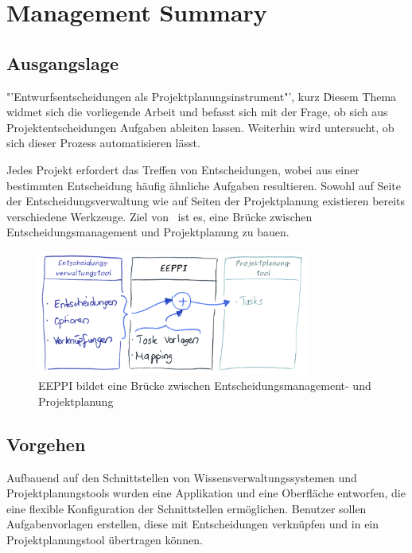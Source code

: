 \chapter{Management Summary}
	\captionsetup[figure]{labelformat=empty} %

	
	\section{Ausgangslage}
	
	"'Entwurfsentscheidungen als Projektplanungsinstrument"', kurz \eeppi\. 
	Diesem Thema widmet sich die vorliegende Arbeit und befasst sich mit der Frage, 
	ob sich aus Projektentscheidungen Aufgaben ableiten lassen. 
	Weiterhin wird untersucht, ob sich dieser Prozess automatisieren lässt. 

	Jedes Projekt erfordert das Treffen von Entscheidungen, 
	wobei aus einer bestimmten Entscheidung häufig ähnliche Aufgaben resultieren. 
	Sowohl auf Seite der Entscheidungsverwaltung wie auf Seiten der Projektplanung existieren bereits verschiedene Werkzeuge. 
	Ziel von \eeppi\ ist es, eine Brücke zwischen Entscheidungsmanagement und Projektplanung zu bauen.
	
	\begin{figure}[H]
		\includegraphics[width=0.8\textwidth]{introduction/img/eeppiVision.png}
		\centering
		\caption{EEPPI bildet eine Brücke zwischen Entscheidungsmanagement- und Projektplanung}
		\label{fig:eeppiBridgeBetweenDecisionsAndTasks}
	\end{figure}
	
	
	\section{Vorgehen}
	
	Aufbauend auf den Schnittstellen von Wissensverwaltungssystemen und Projektplanungstools wurden eine Applikation und eine Oberfläche entworfen, 
	die eine flexible Konfiguration der Schnittstellen ermöglichen. 
	Benutzer sollen Aufgabenvorlagen erstellen, diese mit Entscheidungen verknüpfen und in ein Projektplanungstool übertragen können. 

